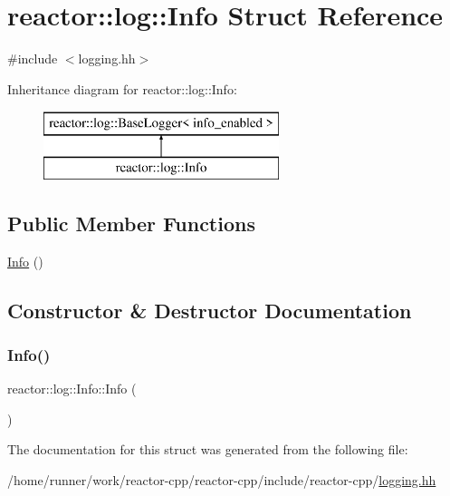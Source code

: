 \hypertarget{structreactor_1_1log_1_1Info}{}\section{reactor\+:\+:log\+:\+:Info Struct Reference}
\label{structreactor_1_1log_1_1Info}


{\ttfamily \#include $<$logging.\+hh$>$}

Inheritance diagram for reactor\+:\+:log\+:\+:Info\+:\begin{figure}[H]
\begin{center}
\leavevmode
\includegraphics[height=2.000000cm]{structreactor_1_1log_1_1Info}
\end{center}
\end{figure}
\subsection*{Public Member Functions}
\begin{DoxyCompactItemize}
\item 
\hyperlink{structreactor_1_1log_1_1Info_abad3878de5e3c6e752d926c78e7da194}{Info} ()
\end{DoxyCompactItemize}


\subsection{Constructor \& Destructor Documentation}
\mbox{\label{structreactor_1_1log_1_1Info_abad3878de5e3c6e752d926c78e7da194}} 
\subsubsection{\texorpdfstring{Info()}{Info()}}
{\footnotesize\ttfamily reactor\+::log\+::\+Info\+::\+Info (\begin{DoxyParamCaption}{ }\end{DoxyParamCaption})\hspace{0.3cm}{\ttfamily [inline]}}



The documentation for this struct was generated from the following file\+:\begin{DoxyCompactItemize}
\item 
/home/runner/work/reactor-\/cpp/reactor-\/cpp/include/reactor-\/cpp/\hyperlink{logging_8hh}{logging.\+hh}\end{DoxyCompactItemize}

